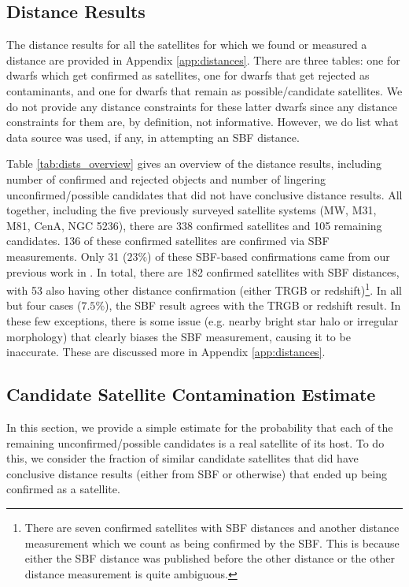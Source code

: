 \documentclass[twocolumn]{aastex62}
\begin{document}



\subsection{Distance Results}
\label{sec:distance_results}

The distance results for all the satellites for which we found or measured a distance are provided in Appendix \ref{app:distances}.  There are three tables: one for dwarfs which get confirmed as satellites, one for dwarfs that get rejected as contaminants, and one for dwarfs that remain as possible/candidate satellites. We do not provide any distance constraints for these latter dwarfs since any distance constraints for them are, by definition, not informative. However, we do list what data source was used, if any, in attempting an SBF distance. 


Table \ref{tab:dists_overview} gives an overview of the distance results, including number of confirmed and rejected objects and number of lingering unconfirmed/possible candidates that did not have conclusive distance results. All together, including the five previously surveyed satellite systems (MW, M31, M81, CenA, NGC 5236), there are 338 confirmed satellites and 105 remaining candidates. 136 of these confirmed satellites are confirmed via SBF measurements. Only 31 ($23\%$) of these SBF-based confirmations came from our previous work in \citet{carlsten2020b}. In total, there are 182 confirmed satellites with SBF distances, with 53 also having other distance confirmation (either TRGB or redshift)\footnote{There are seven confirmed satellites with SBF distances and another distance measurement which we count as being confirmed by the SBF. This is because either the SBF distance was published before the other distance or the other distance measurement is quite ambiguous.}. In all but four cases ($7.5\%$), the SBF result agrees with the TRGB or redshift result. In these few exceptions, there is some issue (e.g. nearby bright star halo or irregular morphology) that clearly biases the SBF measurement, causing it to be inaccurate. These are discussed more in Appendix \ref{app:distances}. 













\subsection{Candidate Satellite Contamination Estimate}
\label{sec:cont_mod}
In this section, we provide a simple estimate for the probability that each of the remaining unconfirmed/possible candidates is a real satellite of its host. To do this, we consider the fraction of similar candidate satellites that did have conclusive distance results (either from SBF or otherwise) that ended up being confirmed as a satellite. 
\end{document}
